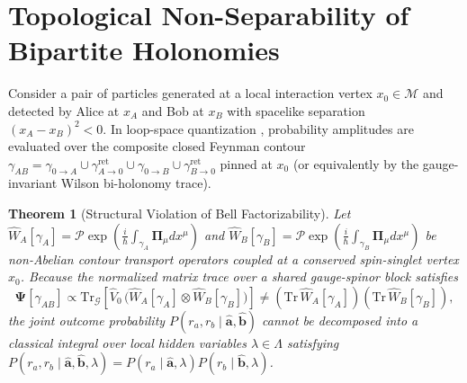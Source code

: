 \documentclass[11pt,a4paper]{article}
\newtheorem{theorem}{Theorem}
\begin{document}
\section{Topological Non-Separability of Bipartite Holonomies}
Consider a pair of particles generated at a local interaction vertex $x_0 \in \mathcal{M}$ and detected by Alice at $x_A$ and Bob at $x_B$ with spacelike separation $(x_A - x_B)^2 < 0$. In loop-space quantization \cite{PavliukMasterDeriv}, probability amplitudes are evaluated over the composite closed Feynman contour $\gamma_{AB} = \gamma_{0 \to A} \cup \gamma_{A \to 0}^{\mathrm{ret}} \cup \gamma_{0 \to B} \cup \gamma_{B \to 0}^{\mathrm{ret}}$ pinned at $x_0$ (or equivalently by the gauge-invariant Wilson bi-holonomy trace).

\begin{theorem}[Structural Violation of Bell Factorizability]
Let $\hat{W}_A[\gamma_A] = \mathcal{P}\exp\!\left(\frac{i}{\hbar}\int_{\gamma_A}\mathbf{\Pi}_\mu dx^\mu\right)$ and $\hat{W}_B[\gamma_B] = \mathcal{P}\exp\!\left(\frac{i}{\hbar}\int_{\gamma_B}\mathbf{\Pi}_\mu dx^\mu\right)$ be non-Abelian contour transport operators coupled at a conserved spin-singlet vertex $x_0$. Because the normalized matrix trace over a shared gauge-spinor block satisfies
\begin{equation}
\mathbf{\Psi}[\gamma_{AB}] \propto \mathrm{Tr}_{\mathcal{G}}\!\left[ \hat{V}_0 \, \big(\hat{W}_A[\gamma_A] \otimes \hat{W}_B[\gamma_B]\big) \right] \neq \left(\mathrm{Tr}\,\hat{W}_A[\gamma_A]\right) \left(\mathrm{Tr}\,\hat{W}_B[\gamma_B]\right),
\end{equation}
the joint outcome probability $P(r_a, r_b \mid \hat{\mathbf{a}}, \hat{\mathbf{b}})$ cannot be decomposed into a classical integral over local hidden variables $\lambda \in \Lambda$ satisfying $P(r_a, r_b \mid \hat{\mathbf{a}}, \hat{\mathbf{b}}, \lambda) = P(r_a \mid \hat{\mathbf{a}}, \lambda) P(r_b \mid \hat{\mathbf{b}}, \lambda)$.
\end{theorem}
\end{document}
